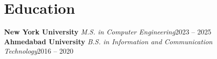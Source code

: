 \documentclass[letterpaper,12pt]{article}
\begin{document}
\section{Education}
\textbf{New York University}\hspace{.5em} {\small\itshape M.S. in Computer Engineering}\hfill{\small\color{muted}2023 -- 2025}\\[1pt]
\textbf{Ahmedabad University}\hspace{.5em} {\small\itshape B.S. in Information and Communication Technology}\hfill{\small\color{muted}2016 -- 2020}
\end{document}
